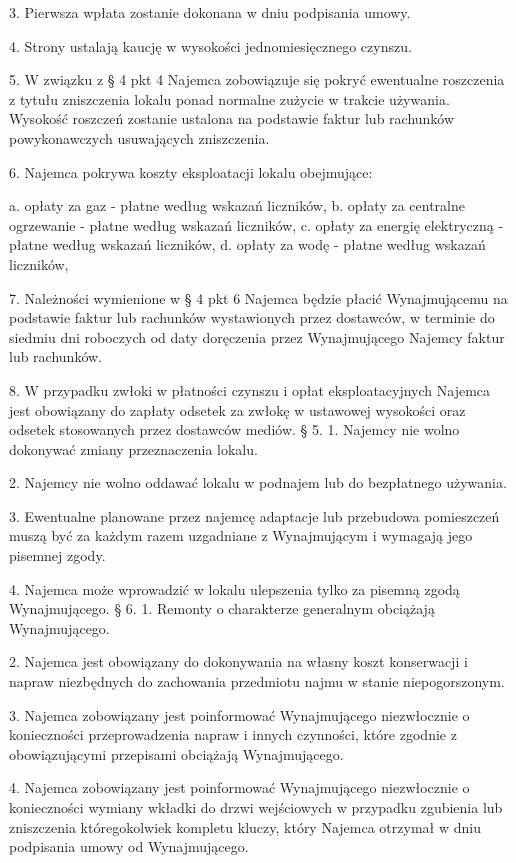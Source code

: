 \documentclass[a4paper,11pt, notitlepage]{article}
\begin{document}
    3. Pierwsza wpłata zostanie dokonana w dniu podpisania umowy.
 	
    4. Strony ustalają kaucję w wysokości jednomiesięcznego czynszu.
 	
    5. W związku z § 4 pkt 4 Najemca zobowiązuje się pokryć ewentualne roszczenia z tytułu zniszczenia lokalu ponad normalne zużycie w trakcie używania. Wysokość roszczeń zostanie ustalona na podstawie faktur lub rachunków powykonawczych usuwających zniszczenia.
 	
    6. Najemca pokrywa koszty eksploatacji lokalu obejmujące:
 	
        a. opłaty za gaz - płatne według wskazań liczników,
        b. opłaty za centralne ogrzewanie - płatne według wskazań liczników,
        c. opłaty za energię elektryczną - płatne według wskazań liczników,
        d. opłaty za wodę - płatne według wskazań liczników,
 	
    7. Należności wymienione w § 4 pkt 6 Najemca będzie płacić 	Wynajmującemu na podstawie faktur lub rachunków wystawionych przez dostawców, w terminie do siedmiu dni roboczych od daty doręczenia przez Wynajmującego Najemcy faktur lub rachunków.
 	
    8. W przypadku zwłoki w płatności czynszu i opłat eksploatacyjnych Najemca jest obowiązany do zapłaty odsetek za zwłokę w ustawowej wysokości oraz odsetek stosowanych przez dostawców mediów.
§ 5.
    1. Najemcy nie wolno dokonywać zmiany przeznaczenia lokalu.
 	
    2. Najemcy nie wolno oddawać lokalu w podnajem lub do bezpłatnego używania.
 	
    3. Ewentualne planowane przez najemcę adaptacje lub przebudowa pomieszczeń muszą 	być za każdym razem uzgadniane z Wynajmującym i wymagają jego 	pisemnej zgody.
 	
    4. Najemca może wprowadzić w lokalu ulepszenia tylko za pisemną zgodą Wynajmującego.
§ 6.
    1. Remonty o charakterze generalnym obciążają Wynajmującego.
 	
    2. Najemca jest obowiązany do dokonywania na własny koszt konserwacji i napraw niezbędnych do zachowania przedmiotu najmu w stanie niepogorszonym.
 	
    3. Najemca zobowiązany jest poinformować Wynajmującego niezwłocznie o konieczności przeprowadzenia napraw i innych czynności, które zgodnie z obowiązującymi przepisami obciążają Wynajmującego.
 	
    4. Najemca zobowiązany jest poinformować Wynajmującego niezwłocznie o konieczności wymiany wkładki do drzwi wejściowych w przypadku 	zgubienia lub zniszczenia któregokolwiek kompletu kluczy, który Najemca otrzymał w dniu podpisania umowy od Wynajmującego.
 	
\end{document}

